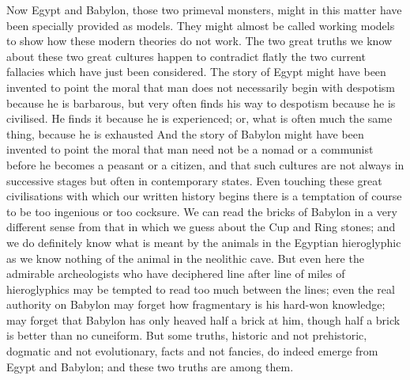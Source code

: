 Now Egypt and Babylon, those two primeval monsters, might in this matter have been specially provided as models. They might almost be called working models to show how these modern theories do not work. The two great truths we know about these two great cultures happen to contradict flatly the two current fallacies which have just been considered. The story of Egypt might have been invented to point the moral that man does not necessarily begin with despotism because he is barbarous, but very often finds his way to despotism because he is civilised. He finds it because he is experienced; or, what is often much the same thing, because he is exhausted And the story of Babylon might have been invented to point the moral that man need not be a nomad or a communist before he becomes a peasant or a citizen, and that such cultures are not always in successive stages but often in contemporary states. Even touching these great civilisations with which our written history begins there is a temptation of course to be too ingenious or too cocksure. We can read the bricks of Babylon in a very different sense from that in which we guess about the Cup and Ring stones; and we do definitely know what is meant by the animals in the Egyptian hieroglyphic as we know nothing of the animal in the neolithic cave. But even here the admirable archeologists who have deciphered line after line of miles of hieroglyphics may be tempted to read too much between the lines; even the real authority on Babylon may forget how fragmentary is his hard-won knowledge; may forget that Babylon has only heaved half a brick at him, though half a brick is better than no cuneiform. But some truths, historic and not prehistoric, dogmatic and not evolutionary, facts and not fancies, do indeed emerge from Egypt and Babylon; and these two truths are among them.

